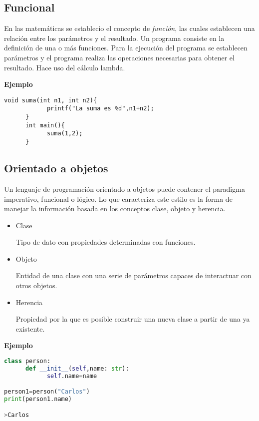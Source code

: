 \subsection*{Funcional}
En las matemáticas se establecio el concepto de \textit{función}, las cuales establecen una relación entre los parámetros y el resultado. Un programa consiste en la definición de una o más funciones. Para la ejecución del programa se establecen parámetros y el programa realiza las operaciones necesarias para obtener el resultado.\cite{Fokker_1996} Hace uso del cálculo lambda.

\textbf{Ejemplo}

\begin{lstlisting}[style=CStyle]
      void suma(int n1, int n2){
            printf("La suma es %d",n1+n2);
      }
      int main(){
            suma(1,2);
      }
\end{lstlisting}
\subsection*{Orientado a objetos}
Un lenguaje de programación orientado a objetos puede contener el paradigma imperativo, funcional o lógico. Lo que caracteriza este estilo es la forma de manejar la información basada en los conceptos clase, objeto y herencia.\cite{rodriguez_2003}
\begin{itemize}
      \item Clase

            Tipo de dato con propiedades determinadas con funciones.
      \item Objeto

            Entidad de una clase con una serie de parámetros capaces de interactuar con otros objetos.
      \item Herencia

            Propiedad por la que es posible construir una nueva clase a partir de una ya existente.

\end{itemize}

\textbf{Ejemplo}

\begin{lstlisting}[language=python]
class person:
      def __init__(self,name: str):
            self.name=name

person1=person("Carlos")
print(person1.name)

>Carlos
\end{lstlisting}